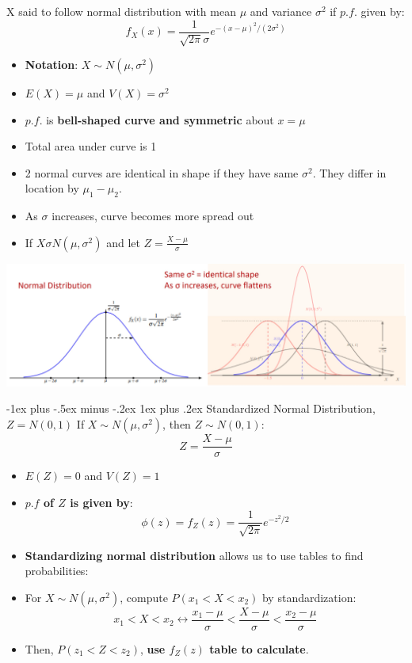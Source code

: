 \documentclass[12pt, landscape]{article}
\makeatletter
\renewcommand{\subsubsection}{\@startsection{subsubsection}{3}{0.1mm}%
                                {-1ex plus -.5ex minus -.2ex}%
                                {1ex plus .2ex}%
                                {\normalfont\small\bfseries}}
\makeatother
\begin{document}
\begin{multicols*}{3}
X said to follow normal distribution with mean $\mu$ and variance $\sigma^2$ if $p.f.$ given by:
\[f_X (x) = \frac{1}{\sqrt{2 \pi} \sigma}e^{-(x-\mu)^2 / (2 \sigma ^2)}\]

\begin{itemize}
    \item \textbf{Notation}: $X \sim N(\mu, \sigma^2)$
    \item $E(X) = \mu$ and $V(X) = \sigma^2$
    \item $p.f.$ is \textbf{bell-shaped curve and symmetric} about $x = \mu$
    \item Total area under curve is 1
    \item 2 normal curves are identical in shape if they have same $\sigma ^2$. They differ in location by $\mu_1 - \mu_2$.
    \item As $\sigma$ increases, curve becomes more spread out
    \item If $X \sigma N(\mu, \sigma^2)$ and let $Z = \frac{X - \mu}{\sigma}$
\end{itemize}
\centerline{\includegraphics[width=1\linewidth]{normal}}



\subsubsection{Standardized Normal Distribution, $Z = N(0, 1)$}
If $X \sim N(\mu, \sigma ^2)$, then  $Z \sim N(0, 1)$:
\[Z = \frac{X - \mu}{\sigma}\]

\begin{itemize}
    \item $E(Z) = 0$ and $V(Z) = 1$
    \item \textbf{$p.f$ of $Z$ is given by}:
	\[\phi(z) = f_Z (z) = \frac{1}{\sqrt{2 \pi}} e^{-z^2 / 2}\]
\end{itemize}
\begin{itemize}
    \item \textbf{Standardizing normal distribution} allows us to use tables to find probabilities:
    \item For $X \sim N(\mu, \sigma^2)$, compute $P(x_1 < X < x_2)$ by standardization:
    \[x_1 < X < x_2 \leftrightarrow \frac{x_1 - \mu}{\sigma} < \frac{X - \mu}{\sigma} < \frac{x_2 - \mu}{\sigma}\]
    \item Then, $P(z_1 < Z < z_2)$, \textbf{use $f_Z (z)$ table to calculate}.   
 \end{itemize}
 

\end{multicols*}
\end{document}
